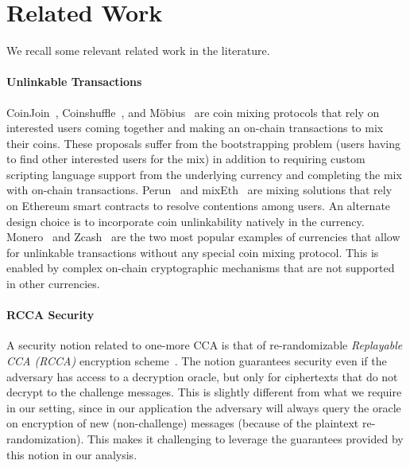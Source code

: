 \section{Related Work}
We recall some relevant related work in the literature.

\paragraph{Unlinkable Transactions} CoinJoin~\cite{coinjoin}, Coinshuffle~\cite{ESORICS:RufMorKat14,EPRINT:RufMorKat16,FCW:RufMor17}, and Möbius~\cite{PoPETS:MeiMer18} are coin mixing protocols that rely on interested users coming together and making an on-chain transactions to mix their coins. 
These proposals suffer from the bootstrapping problem (users having to find other interested users for the mix) in addition to requiring custom scripting language support from the underlying currency and completing the mix with on-chain transactions. 
Perun~\cite{SP:DEFM19} and mixEth~\cite{EPRINT:SNBB19} are mixing solutions that  rely on Ethereum smart contracts to resolve contentions among users. 
An alternate design choice is to incorporate coin unlinkability natively in the currency.
Monero~\cite{CCS:LRRSTW19} and Zcash~\cite{SP:BCGGMT14} are the two most popular examples of currencies that allow for unlinkable transactions without any special coin mixing protocol. This is enabled by complex on-chain cryptographic mechanisms that are not supported in other currencies.

\paragraph{RCCA Security} A security notion related to one-more CCA is that of re-randomizable \emph{Replayable CCA (RCCA)} encryption scheme~\cite{C:PraRos07}. The notion guarantees security even if the adversary has access to a decryption oracle, but only for ciphertexts that do not decrypt to the challenge messages. This is slightly different from what we require in our setting, since in our application the adversary will always query the oracle on encryption of new (non-challenge) messages (because of the plaintext re-randomization). This makes it challenging to leverage the guarantees provided by this notion in our analysis.